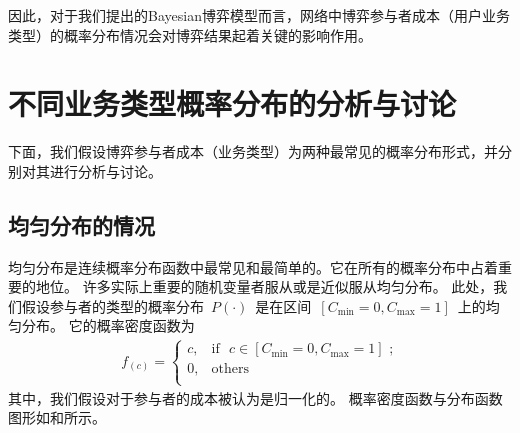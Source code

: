 因此，对于我们提出的Bayesian博弈模型而言，网络中博弈参与者成本（用户业务类型）的概率分布情况会对博弈结果起着关键的影响作用。
\section{不同业务类型概率分布的分析与讨论}
下面，我们假设博弈参与者成本（业务类型）为两种最常见的概率分布形式，并分别对其进行分析与讨论。
\subsection{均匀分布的情况}
均匀分布是连续概率分布函数中最常见和最简单的。它在所有的概率分布中占着重要的地位。
许多实际上重要的随机变量者服从或是近似服从均匀分布。
此处，我们假设参与者的类型的概率分布~$P(\cdot)$~是在区间~$[C_{\min}=0, C_{\max}=1]$~上的均匀分布。
它的概率密度函数为
\begin{align}
    f_(c) = \begin{cases} c, &\text{if ~$c \in [C_{\min}=0, C_{\max}=1]$~;}\\
        0, &\text{others}\\ 
    \end{cases} 
    \label{eqn_equilibrium_prob} 
\end{align}
其中，我们假设对于参与者的成本被认为是归一化的。
概率密度函数与分布函数图形如和所示。
